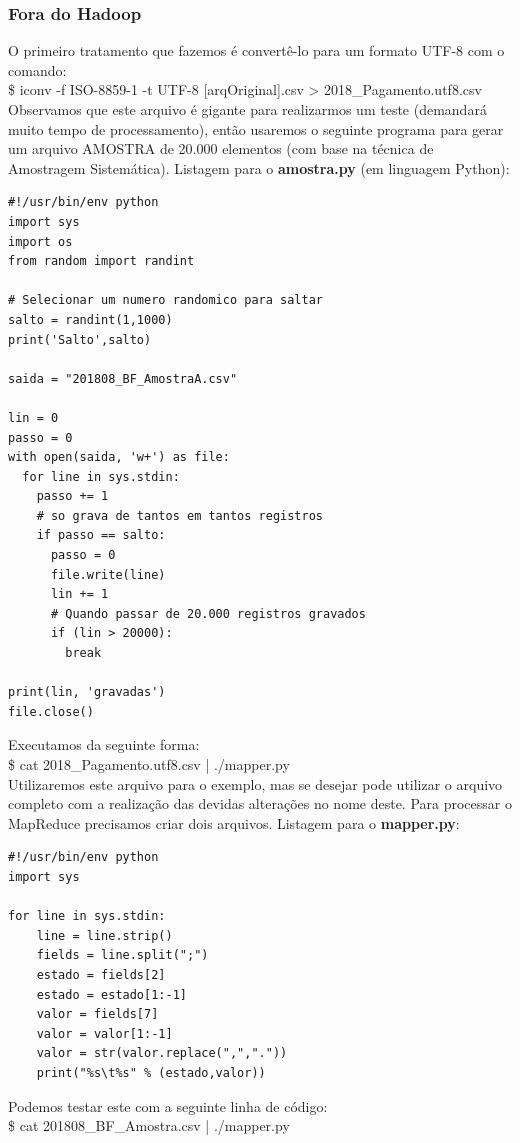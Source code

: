 \documentclass[a4paper,11pt]{article}
\begin{document}
\subsubsection{Fora do Hadoop}
O primeiro tratamento que fazemos é convertê-lo para um formato UTF-8 com o comando: \\
{\ttfamily\$ iconv -f ISO-8859-1 -t UTF-8 [arqOriginal].csv > 2018\_Pagamento.utf8.csv} \\[2mm]
Observamos que este arquivo é gigante para realizarmos um teste (demandará muito tempo de processamento), então usaremos o seguinte programa para gerar um arquivo AMOSTRA de 20.000 elementos (com base na técnica de Amostragem Sistemática). Listagem para o \textbf{amostra.py} (em linguagem Python):
\begin{lstlisting}
#!/usr/bin/env python
import sys
import os
from random import randint

# Selecionar um numero randomico para saltar
salto = randint(1,1000)
print('Salto',salto)

saida = "201808_BF_AmostraA.csv"

lin = 0
passo = 0
with open(saida, 'w+') as file:
  for line in sys.stdin:
    passo += 1
    # so grava de tantos em tantos registros
    if passo == salto:
      passo = 0
      file.write(line)            
      lin += 1
      # Quando passar de 20.000 registros gravados
      if (lin > 20000):
        break

print(lin, 'gravadas')
file.close()
\end{lstlisting}
Executamos da seguinte forma: \\
{\ttfamily\$ cat 2018\_Pagamento.utf8.csv | ./mapper.py} \\[2mm]
Utilizaremos este arquivo para o exemplo, mas se desejar pode utilizar o arquivo completo com a realização das devidas alterações no nome deste. Para processar o MapReduce precisamos criar dois arquivos. Listagem para o \textbf{mapper.py}:
\begin{lstlisting}
#!/usr/bin/env python
import sys

for line in sys.stdin:
	line = line.strip()
	fields = line.split(";")
	estado = fields[2]
	estado = estado[1:-1]
	valor = fields[7]
	valor = valor[1:-1]
	valor = str(valor.replace(",","."))
	print("%s\t%s" % (estado,valor))
\end{lstlisting}
Podemos testar este com a seguinte linha de código: \\
{\ttfamily\$ cat 201808\_BF\_Amostra.csv | ./mapper.py} \\[2mm]
\end{document}
